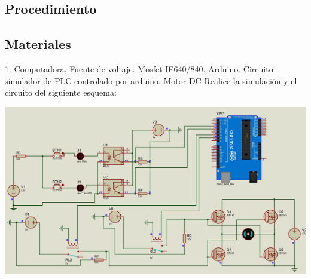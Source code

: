 \documentclass[12pt,a4paper]{article}
\begin{document}
\newpage
\begin{flushleft}
\begin{center}
\section{Procedimiento}
\end{center}
\subsection{Materiales}
\end{flushleft}
\begin{flushleft}
1. Computadora. Fuente de voltaje. Mosfet IF640/840. Arduino. Circuito simulador de PLC controlado por arduino. Motor DC\linebreak
\linebreak
Realice la simulación y el circuito del siguiente esquema:\\
\end{flushleft}
\begin{center}
\includegraphics[scale=0.22]{imagenes/simu0.JPG}\linebreak
\end{center}
\newpage
\end{document}
